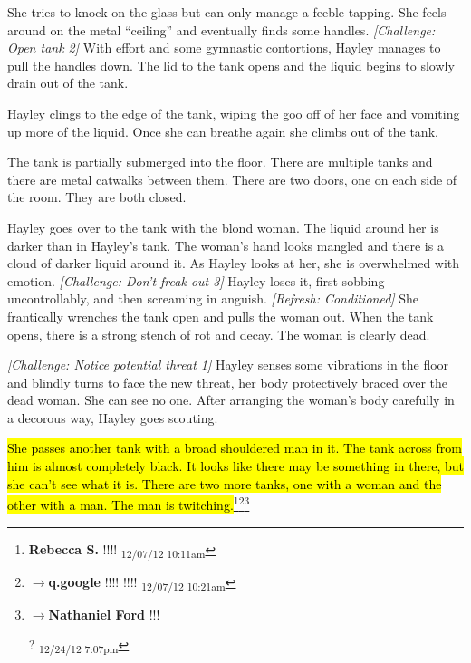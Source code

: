 She tries to knock on the glass but can only manage a feeble tapping.  She feels around on the metal ``ceiling'' and eventually finds some handles.  \textit{{[}Challenge: Open tank 2{]}}  With effort and some gymnastic contortions, Hayley manages to pull the handles down.  The lid to the tank opens and the liquid begins to slowly drain out of the tank.



Hayley clings to the edge of the tank, wiping the goo off of her face and vomiting up more of the liquid.  Once she can breathe again she climbs out of the tank.



The tank is partially submerged into the floor.  There are multiple tanks and there are metal catwalks between them.  There are two doors, one on each side of the room.  They are both closed.



Hayley goes over to the tank with the blond woman.  The liquid around her is darker than in Hayley's tank.  The woman's hand looks mangled and there is a cloud of darker liquid around it.  As Hayley looks at her, she is overwhelmed with emotion.  \textit{{[}Challenge: Don't freak out 3{]}}  Hayley loses it, first sobbing uncontrollably, and then screaming in anguish.  \textit{{[}Refresh: Conditioned{]}} She frantically wrenches the tank open and pulls the woman out.  When the tank opens, there is a strong stench of rot and decay. The woman is clearly dead.



\textit{{[}Challenge: Notice potential threat 1{]}} Hayley senses some vibrations in the floor and blindly turns to face the new threat, her body protectively braced over the dead woman.  She can see no one.  After arranging the woman's body carefully in a decorous way, Hayley goes scouting.  



\hl{She passes another tank with a broad shouldered man in it.  The tank across from him is almost completely black.   It looks like there may be something in there, but she can't see what it is.  There are two more tanks, one with a woman and the other with a man.  The man is twitching.}\footnote{\textbf{Rebecca S. }!!!! \textsubscript{12/07/12 10:11am}}\footnote{$\rightarrow$\textbf{q.google }!!!! !!!! \textsubscript{12/07/12 10:21am}}\footnote{$\rightarrow$\textbf{Nathaniel Ford }!!!

? \textsubscript{12/24/12 7:07pm}} 



